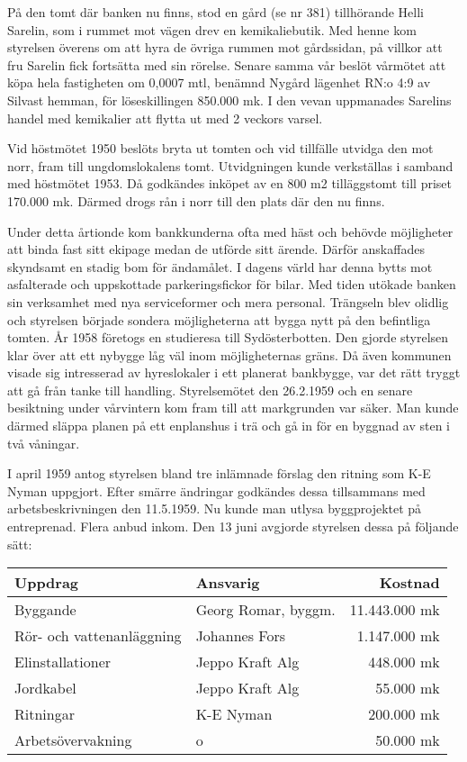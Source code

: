 På den tomt där banken nu finns, stod en gård (se nr 381) tillhörande Helli Sarelin, som i rummet mot vägen drev en kemikaliebutik. Med henne kom styrelsen överens om att hyra de övriga rummen mot gårdssidan, på villkor att fru Sarelin fick fortsätta med sin rörelse. Senare samma vår beslöt vårmötet att köpa hela fastigheten om 0,0007 mtl, benämnd Nygård lägenhet RN:o 4:9 av Silvast hemman, för löseskillingen 850.000 mk. I den vevan uppmanades Sarelins handel med kemikalier att flytta ut med 2 veckors varsel.

Vid höstmötet 1950 beslöts bryta ut tomten och vid tillfälle utvidga den mot norr, fram till ungdomslokalens tomt. Utvidgningen kunde verkställas i samband med höstmötet 1953. Då godkändes inköpet av en 800 m2 tilläggstomt till priset 170.000 mk. Därmed drogs rån i norr till den plats där den nu finns.

Under detta årtionde kom bankkunderna ofta med häst och behövde möjligheter att binda fast sitt ekipage medan de utförde sitt ärende. Därför anskaffades skyndsamt en stadig bom för ändamålet. I dagens värld har denna bytts mot asfalterade och uppskottade parkeringsfickor för bilar.
Med tiden utökade banken sin verksamhet med nya serviceformer och mera personal. Trängseln blev olidlig och styrelsen började sondera möjligheterna att bygga nytt på den befintliga tomten. År 1958 företogs en studieresa till Sydösterbotten. Den gjorde styrelsen klar över att ett nybygge låg väl inom möjligheternas gräns. Då även kommunen visade sig intresserad av hyreslokaler i ett planerat bankbygge, var det rätt tryggt att gå från tanke till handling. Styrelsemötet den 26.2.1959 och en senare besiktning under vårvintern kom fram till att markgrunden var säker. Man kunde därmed släppa planen på ett enplanshus i trä och gå in för en byggnad av sten i två våningar.

I april 1959 antog styrelsen bland tre inlämnade förslag den ritning som K-E Nyman uppgjort. Efter smärre ändringar godkändes dessa tillsammans med arbetsbeskrivningen den 11.5.1959. Nu kunde man utlysa byggprojektet på entreprenad. Flera anbud inkom. Den 13 juni avgjorde styrelsen dessa på följande sätt:

\begin{center}
  \begin{tabular}{l l r}
    \hline
    Uppdrag & Ansvarig & Kostnad \\ \hline
    Byggande & Georg Romar, byggm. & 11.443.000 mk \\
    Rör- och vattenanläggning & Johannes Fors & 1.147.000 mk \\
    Elinstallationer & Jeppo Kraft Alg & 448.000 mk \\
    Jordkabel & Jeppo Kraft Alg & 55.000 mk \\
    Ritningar & K-E Nyman & 200.000 mk \\
    Arbetsövervakning & o & 50.000 mk \\
    \hline
  \end{tabular}
\end{center}

